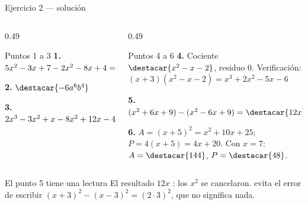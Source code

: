 \documentclass[aspectratio=169,10pt]{beamer}
\begin{document}
\begin{frame}{Ejercicio 2 — solución}
  \tiny
  \begin{columns}[T,onlytextwidth]
    \begin{column}{0.49\textwidth}
      \begin{block}{Puntos 1 a 3}
        \tiny
        \textbf{1.} $5x^2-3x+7-2x^2-8x+4
        = \destacar{3x^{2}-11x+11}$

        \vspace{0.08cm}
        \textbf{2.} $\destacar{-6a^{6}b^{4}}$

        \vspace{0.08cm}
        \textbf{3.} $2x^3-3x^2+x-8x^2+12x-4
        = \destacar{2x^{3}-11x^{2}+13x-4}$
      \end{block}
    \end{column}
    \begin{column}{0.49\textwidth}
      \begin{block}{Puntos 4 a 6}
        \tiny
        \textbf{4.} Cociente $\destacar{x^{2}-x-2}$, residuo $0$.
        Verificación: $(x+3)(x^2-x-2) = x^3+2x^2-5x-6$ \checkmark

        \vspace{0.08cm}
        \textbf{5.} $(x^2+6x+9)-(x^2-6x+9) = \destacar{12x}$

        \vspace{0.08cm}
        \textbf{6.} $A = (x+5)^{2} = x^2+10x+25$; \ $P = 4(x+5) = 4x+20$.
        Con $x=7$: $A = \destacar{144}$, $P = \destacar{48}$.
      \end{block}
    \end{column}
  \end{columns}

  \vspace{0.08cm}
  \begin{alertblock}{El punto 5 tiene una lectura}
    \tiny
    El resultado $12x$ : los $x^2$ se
    cancelaron.  evita el error de escribir
    $(x+3)^2-(x-3)^2 = (2\cdot 3)^2$, que no significa nada.
  \end{alertblock}
\end{frame}
\end{document}
